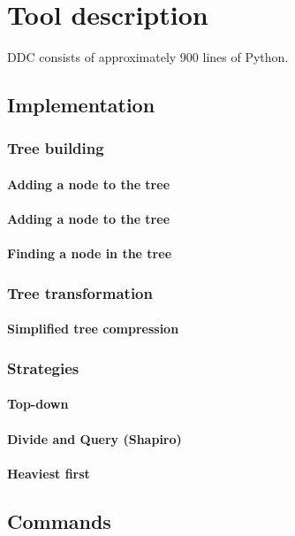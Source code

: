 \chapter{Tool description}
\label{cap:descripcionHerramienta}
DDC consists of approximately 900 lines of Python.


\section{Implementation}
\subsection{Tree building}
\subsubsection{Adding a node to the tree}
\subsubsection{Adding a node to the tree}
\subsubsection{Finding a node in the tree}
\subsection{Tree transformation}
\subsubsection{Simplified tree compression}
\subsection{Strategies}
\subsubsection{Top-down}
\subsubsection{Divide and Query (Shapiro)}
\subsubsection{Heaviest first}
\section{Commands}
